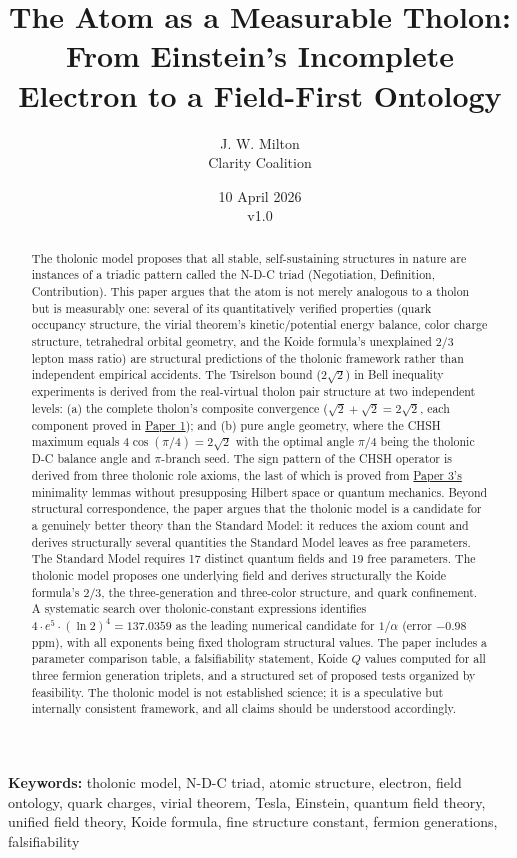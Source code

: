 \documentclass[12pt]{article}
\title{The Atom as a Measurable Tholon:\\
\large From Einstein's Incomplete Electron to a Field-First Ontology}
\author{J. W. Milton\\[4pt]{\small Clarity Coalition}}
\date{\small 10 April 2026 \\ v1.0}
\begin{document}
\maketitle

\noindent\textbf{Keywords:} tholonic model, N-D-C triad, atomic structure, electron, field ontology, quark charges, virial theorem, Tesla, Einstein, quantum field theory, unified field theory, Koide formula, fine structure constant, fermion generations, falsifiability

\begin{abstract}
The tholonic model proposes that all stable, self-sustaining structures
in nature are instances of a triadic pattern called the N-D-C triad
(Negotiation, Definition, Contribution). This paper argues that the atom
is not merely analogous to a tholon but is measurably one: several of
its quantitatively verified properties (quark occupancy structure, the
virial theorem's kinetic/potential energy balance, color charge
structure, tetrahedral orbital geometry, and the Koide formula's
unexplained \(2/3\) lepton mass ratio) are structural predictions of the
tholonic framework rather than independent empirical accidents. The
Tsirelson bound (\(2\sqrt{2}\)) in Bell inequality experiments is
derived from the real-virtual tholon pair structure at two independent
levels: (a) the complete tholon's composite convergence
(\(\sqrt{2} + \sqrt{2} = 2\sqrt{2}\), each component proved in
\href{https://github.com/baardev/truevalue/blob/main/docnav/Research/papers/1_recursive-tholonic-five-constants/1_recursive-tholonic-five-constants.pdf}{Paper
1}); and (b) pure angle geometry, where the CHSH maximum equals
\(4\cos(\pi/4) = 2\sqrt{2}\) with the optimal angle \(\pi/4\) being the
tholonic D-C balance angle and \(\pi\)-branch seed. The sign pattern of
the CHSH operator is derived from three tholonic role axioms, the last
of which is proved from
\href{https://github.com/baardev/truevalue/blob/main/docnav/Research/papers/3_minimal-recursive-triadic-framework/3_minimal-recursive-triadic-framework.pdf}{Paper
3's} minimality lemmas without presupposing Hilbert space or quantum
mechanics. Beyond structural correspondence, the paper argues that the
tholonic model is a candidate for a genuinely better theory than the
Standard Model: it reduces the axiom count and derives structurally
several quantities the Standard Model leaves as free parameters. The
Standard Model requires 17 distinct quantum fields and 19 free
parameters. The tholonic model proposes one underlying field and derives
structurally the Koide formula's \(2/3\), the three-generation and
three-color structure, and quark confinement. A systematic search over
tholonic-constant expressions identifies
\(4 \cdot e^5 \cdot (\ln 2)^4 = 137.0359\) as the leading numerical
candidate for \(1/\alpha\) (error \(-0.98\) ppm), with all exponents
being fixed thologram structural values. The paper includes a parameter
comparison table, a falsifiability statement, Koide \(Q\) values
computed for all three fermion generation triplets, and a structured set
of proposed tests organized by feasibility. The tholonic model is not
established science; it is a speculative but internally consistent
framework, and all claims should be understood accordingly.
\end{abstract}
\end{document}

